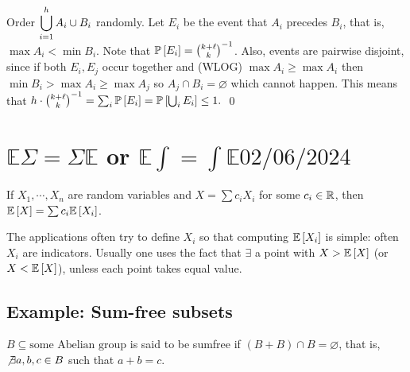 \begin{pf}
Order $\ds\bigcup_{i=1}^h A_i\cup B_i$ randomly. Let $E_i$ be the event that $A_i$ precedes $B_i$, that is, $\max A_i < \min B_i$. Note that $\P{E_i} = {k+\ell\choose k}^{-1}$. Also, events are pairwise disjoint, since if both $E_i,E_j$ occur together and (WLOG) $\max A_i \geq \max A_i$ then $\min B_i > \max A_i \geq \max A_j$ so $A_j\cap B_i=\varnothing$ which cannot happen. This means that $h\cdot {k+\ell\choose k}^{-1}=\sum_i\P{E_i} = \P{\bigcup_i E_i} \leq 1.$
\qed\end{pf}



\chapter{$\mathbb E\Sigma = \Sigma\mathbb E$ or $\mathbb E\int = \int \mathbb E$\hfill \small $02/06/2024\qquad$}

\begin{thm}\label{LOE}
If $X_1,\cdots,X_n$ are random variables and $X =\sum c_iX_i$ for some $c_i\in\R$, then $\E X=\sum c_i\E {X_i}$.
\end{thm}

The applications often try to define $X_i$ so that computing $\E{X_i}$ is simple: often $X_i$ are indicators. Usually one uses the fact that $\exists$ a point with $X>\E X$ (or $X<\E X$), unless each point takes equal value.

\section{Example: Sum-free subsets}

\begin{defn}
$B\subseteq\text{some Abelian group}$ is said to be sumfree if $(B+B)\cap B=\varnothing$, that is, $\not\exists a,b,c\in B$ such that $a+b=c$.
\end{defn}

